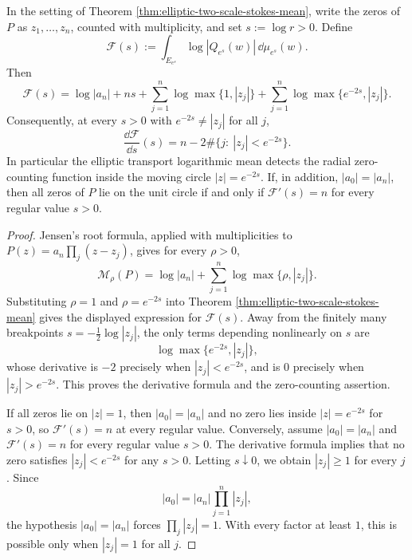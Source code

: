 \begin{theorem}\label{thm:transported-jensen-shell-count}
In the setting of Theorem \ref{thm:elliptic-two-scale-stokes-mean}, write the zeros of \(P\) as \(z_1,\dots,z_n\), counted with multiplicity, and set \(s:=\log r>0\). Define
\[
\mathcal F(s):=\int_{E_{e^s}}\log|Q_{e^s}(w)|\,\dd\mu_{e^s}(w).
\]
Then
\[
\mathcal F(s)=\log|a_n|+ns+
\sum_{j=1}^{n}\log\max\{1,|z_j|\}+
\sum_{j=1}^{n}\log\max\{e^{-2s},|z_j|\}.
\]
Consequently, at every \(s>0\) with \(e^{-2s}\ne |z_j|\) for all \(j\),
\[
\frac{\dd\mathcal F}{\dd s}(s)
=n-2\#\{j:\ |z_j|<e^{-2s}\}.
\]
In particular the elliptic transport logarithmic mean detects the radial zero-counting function inside the moving circle \(|z|=e^{-2s}\). If, in addition, \(|a_0|=|a_n|\), then all zeros of \(P\) lie on the unit circle if and only if \(\mathcal F'(s)=n\) for every regular value \(s>0\).
\end{theorem}

\begin{proof}
Jensen's root formula, applied with multiplicities to \(P(z)=a_n\prod_j(z-z_j)\), gives for every \(\rho>0\),
\[
\mathcal M_\rho(P)=\log|a_n|+
\sum_{j=1}^{n}\log\max\{\rho,|z_j|\}.
\]
Substituting \(\rho=1\) and \(\rho=e^{-2s}\) into Theorem \ref{thm:elliptic-two-scale-stokes-mean} gives the displayed expression for \(\mathcal F(s)\). Away from the finitely many breakpoints \(s=-\frac12\log|z_j|\), the only terms depending nonlinearly on \(s\) are
\[
\log\max\{e^{-2s},|z_j|\},
\]
whose derivative is \(-2\) precisely when \(|z_j|<e^{-2s}\), and is \(0\) precisely when \(|z_j|>e^{-2s}\). This proves the derivative formula and the zero-counting assertion.

If all zeros lie on \(|z|=1\), then \(|a_0|=|a_n|\) and no zero lies inside \(|z|=e^{-2s}\) for \(s>0\), so \(\mathcal F'(s)=n\) at every regular value. Conversely, assume \(|a_0|=|a_n|\) and \(\mathcal F'(s)=n\) for every regular value \(s>0\). The derivative formula implies that no zero satisfies \(|z_j|<e^{-2s}\) for any \(s>0\). Letting \(s\downarrow0\), we obtain \(|z_j|\ge1\) for every \(j\). Since
\[
|a_0|=|a_n|\prod_{j=1}^{n}|z_j|,
\]
the hypothesis \(|a_0|=|a_n|\) forces \(\prod_j|z_j|=1\). With every factor at least \(1\), this is possible only when \(|z_j|=1\) for all \(j\).
\end{proof}

